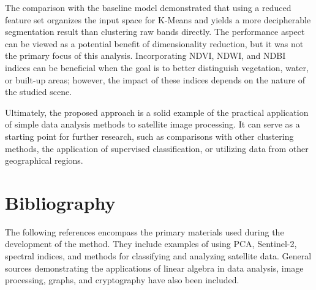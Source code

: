 \documentclass[12pt,a4paper]{article}
\begin{document}
    The comparison with the baseline model demonstrated that using a reduced feature set organizes the input space for K-Means and yields a more decipherable segmentation result than clustering raw bands directly. The performance aspect can be viewed as a potential benefit of dimensionality reduction, but it was not the primary focus of this analysis. Incorporating NDVI, NDWI, and NDBI indices can be beneficial when the goal is to better distinguish vegetation, water, or built-up areas; however, the impact of these indices depends on the nature of the studied scene.

    Ultimately, the proposed approach is a solid example of the practical application of simple data analysis methods to satellite image processing. It can serve as a starting point for further research, such as comparisons with other clustering methods, the application of supervised classification, or utilizing data from other geographical regions.



\section{Bibliography}
\label{sec:bibliografia}

The following references encompass the primary materials used during the development of the method. They include examples of using PCA, Sentinel-2, spectral indices, and methods for classifying and analyzing satellite data. General sources demonstrating the applications of linear algebra in data analysis, image processing, graphs, and cryptography have also been included.
\end{document}
